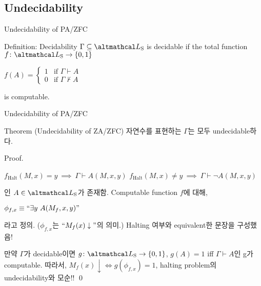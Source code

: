 \documentclass[../231120_msquare_computational-logic.tex]{subfiles}
\begin{document}
\subsection{Undecidability}
\begin{frame}{Undecidability of PA/ZFC}
    \begin{block}{Definition: Decidability}
        \(\Gamma \subseteq \LS\) is decidable if the total function \(f \colon \LS \to \{0,1\}\)
        \centerline{
            \(f(A) = \begin{cases}
                1 & \text{if } \Gamma \vdash A \\
                0 & \text{if }\Gamma \not\vdash A
            \end{cases}\)
        }
        is computable.
    \end{block}
\end{frame}

\begin{frame}{Undecidability of PA/ZFC}
    \begin{block}{Theorem (Undecidability of ZA/ZFC)}
        자연수를 표현하는 \(\Gamma\)는 모두 undecidable하다.
    \end{block}
    \pause
    \begin{block}{Proof.}
        \begin{itemize}
            \ii \(f_\text{Halt}(M, x) = y \ \implies\ \Gamma \vdash A(M, x, y)\)
            \ii \(f_\text{Halt}(M, x) \neq y \ \implies\ \Gamma \vdash \lnot A(M, x, y)\)
        \end{itemize}
        인 \(A \in \LS\)가 존재함.
        Computable function \(f\)에 대해,
        \centerline{\(\phi_{f,x} \equiv ``\exists y\ A(M_f, x, y)"\)}
        라고 정의. (\(\phi_{f,x}\)는 \(``M_f(x) \downarrow"\)의 의미.)
        {Halting 여부와 equivalent한 문장을 구성했음!}

        만약 \(\Gamma\)가 decidable이면 \(g \colon \LS \to \{0, 1\}\),
        \(g(A) = 1\) iff \(\Gamma \vdash A\)인 g가 computable.
        따라서, \ul{\(M_f(x) \downarrow \iff g(\phi_{f, x}) = 1\)},
        halting problem의 undecidability와 모순!! \qed
    \end{block}
\end{frame}
\end{document}
